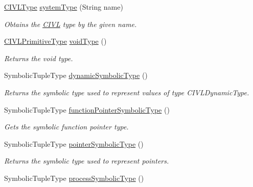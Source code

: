 \begin{DoxyCompactItemize}
\hyperlink{interfaceedu_1_1udel_1_1cis_1_1vsl_1_1civl_1_1model_1_1IF_1_1type_1_1CIVLType}{C\+I\+V\+L\+Type} \hyperlink{interfaceedu_1_1udel_1_1cis_1_1vsl_1_1civl_1_1model_1_1IF_1_1CIVLTypeFactory_afff258954b19be64283001c51e1670dd}{system\+Type} (String name)
\begin{DoxyCompactList}\small\item\em Obtains the \hyperlink{classedu_1_1udel_1_1cis_1_1vsl_1_1civl_1_1CIVL}{C\+I\+V\+L} type by the given name. \end{DoxyCompactList}\item 
\hyperlink{interfaceedu_1_1udel_1_1cis_1_1vsl_1_1civl_1_1model_1_1IF_1_1type_1_1CIVLPrimitiveType}{C\+I\+V\+L\+Primitive\+Type} \hyperlink{interfaceedu_1_1udel_1_1cis_1_1vsl_1_1civl_1_1model_1_1IF_1_1CIVLTypeFactory_aff4b164f7b7a02e3173d88ac2ed9026f}{void\+Type} ()
\begin{DoxyCompactList}\small\item\em Returns the void type. \end{DoxyCompactList}\item 
Symbolic\+Tuple\+Type \hyperlink{interfaceedu_1_1udel_1_1cis_1_1vsl_1_1civl_1_1model_1_1IF_1_1CIVLTypeFactory_a1028abe32689aadc390506eb441464bb}{dynamic\+Symbolic\+Type} ()
\begin{DoxyCompactList}\small\item\em Returns the symbolic type used to represent values of type C\+I\+V\+L\+Dynamic\+Type. \end{DoxyCompactList}\item 
Symbolic\+Tuple\+Type \hyperlink{interfaceedu_1_1udel_1_1cis_1_1vsl_1_1civl_1_1model_1_1IF_1_1CIVLTypeFactory_a37e00dd13c46ac88572f612f2db48f49}{function\+Pointer\+Symbolic\+Type} ()
\begin{DoxyCompactList}\small\item\em Gets the symbolic function pointer type. \end{DoxyCompactList}\item 
Symbolic\+Tuple\+Type \hyperlink{interfaceedu_1_1udel_1_1cis_1_1vsl_1_1civl_1_1model_1_1IF_1_1CIVLTypeFactory_a3a7ab8c61f1b1f4a73ef63a922e83237}{pointer\+Symbolic\+Type} ()
\begin{DoxyCompactList}\small\item\em Returns the symbolic type used to represent pointers. \end{DoxyCompactList}\item 
Symbolic\+Tuple\+Type \hyperlink{interfaceedu_1_1udel_1_1cis_1_1vsl_1_1civl_1_1model_1_1IF_1_1CIVLTypeFactory_a966c01334c8781bc88a8989770f1b7a1}{process\+Symbolic\+Type} ()

\end{DoxyCompactItemize}
